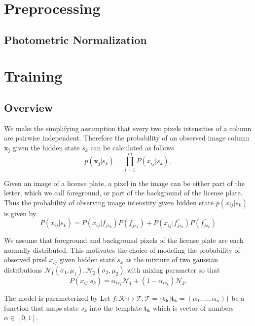 \documentclass[a4paper,12pt]{article}
\newcounter{jpNoteCounter}
\newcommand{\jpnote}[1]{{\scriptsize  \color{Cblue} $\blacksquare$ \refstepcounter{jpNoteCounter}\textsf{[JP]$_{\arabic{jpNoteCounter}}$:{#1}}}}
\renewcommand{\jpnote}[1]{}
\begin{document}
  \section{Preprocessing}
  \subsection{Photometric Normalization}

  \section{Training}
  \subsection{Overview}
  We make the simplifying assumption that every two pixels intensities
  of a column are pairwise independent. Therefore the probability of
  an observed image column $\mathbf{x_j}$ given the hidden state $s_k$
  can be calculated as follows
  \begin{equation}
    p(\mathbf{x_j}|s_k) = \prod_{i=1}^{m} P(x_{ij}|s_k) ,
  \end{equation}
  
  Given an image of a license plate, a pixel in the image can be
  either part of the letter, which we call foreground, or part of the
  background of the license plate.  Thus the probability of observing
  image intenstity given hidden state $p(x_{ij}|s_k)$ is given by
  \begin{equation}
    P(x_{ij}|s_k)=P(x_{ij}|f_{js_k})P(f_{js_k})+P(x_{ij}|\bar{f_{js_k}})P(\bar{f_{js_k}})
  \end{equation}
  
  
  We assume that foreground and background pixels of the license plate
  are each normally distributed.  This motivates the choice of
  modeling the probability of observed pixel $x_{ij}$ given hidden
  state $s_k$ as the mixture of two gaussian distributions
  $\mathcal{N}_1(\sigma_1, \mu_1), \mathcal{N}_2(\sigma_2, \mu_2)$
  with mixing parameter so that
  \begin{equation}
    P(x_{ij} | s_k) = \alpha_{is_k} \mathcal{N}_1 + (1-\alpha_{is_k})
    \mathcal{N}_2 .
  \end{equation}

  \jpnote{need to talk about how the model enables different
    distributions for each row of each hidden state}

  
  The model is parameterized by Let $f : \mathcal{K} \mapsto
  \mathcal{T}, \mathcal{T} = \{ \mathbf{t_k} | \mathbf{t_k} =
  (\alpha_1 , \dots , \alpha_n)\}$ be a function that maps state $s_k$
  into the template $\mathbf{t_k}$ which is vector of numbers $\alpha
  \in [0, 1]$.
\end{document}
